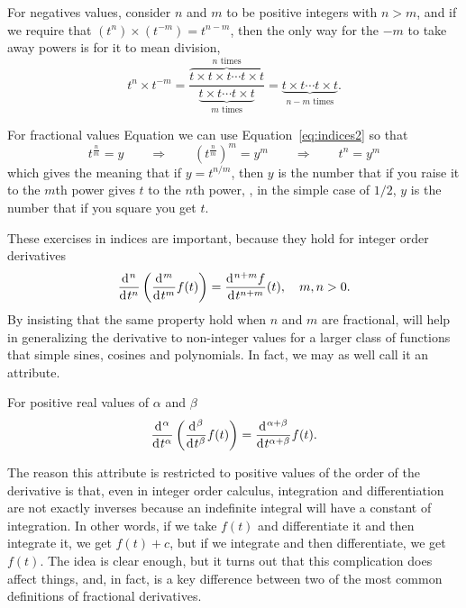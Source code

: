 For negatives values, consider $n$ and $m$ to be positive integers with $n > m$, and if we require that $\left( t^n \right) \times \left( t^{-m} \right) = t^{n-m}$, then the only way for the $-m$ to take away powers is for it to mean division, 
\begin{equation}
  t^n \times t^{-m} = \frac{\overbrace{t \times t \times t \cdots t \times t}^{\mbox{$n$ times}}}{\underbrace{t \times t \cdots t \times t}_{\mbox{$m$ times}}} = \underbrace{t \times t  \cdots t \times t}_{\mbox{$n-m$ times}}.
  \label{eq:indices3}
\end{equation}

For fractional values Equation we can use Equation~\ref{eq:indices2} so that
\begin{equation}
  t^\frac{n}{m} = y \qquad \Longrightarrow \qquad \left( t^\frac{n}{m} \right)^m = y^m \qquad \Longrightarrow \qquad t^n = y^m
\end{equation}
which gives the meaning that if $y = t^{n/m}$, then $y$ is the number that if you raise it to the $m$th power gives $t$ to the $n$th power, \eg, in the simple case of $1/2$, $y$ is the number that if you square you get $t$.

These exercises in indices are important, because they hold for integer order derivatives
\begin{equation}
  \label{eq:derivindex}
  \frac{\operatorname{d}\hspace*{-1pt}^n}{\operatorname{d}\hspace*{-1pt} t^n} \left( \frac{\operatorname{d}\hspace*{-1pt}^m}{\operatorname{d}\hspace*{-1pt} t^m} f(t) \right) = \frac{\operatorname{d}\hspace*{-1pt}^{n+m} f}{\operatorname{d}\hspace*{-1pt} t^{n+m}}(t), \quad m,n > 0.
\end{equation}
By insisting that the same property hold when $n$ and $m$ are fractional, will help in generalizing the derivative to non-integer values for a larger class of functions that simple sines, cosines and polynomials. In fact, we may as well call it an attribute. 

\begin{attribute}
  For positive real values of $\alpha$ and $\beta$
  \begin{equation}
	\frac{\operatorname{d}\hspace*{-1pt}^\alpha}{\operatorname{d}\hspace*{-1pt} t^\alpha} \left( \frac{\operatorname{d}\hspace*{-1pt}^\beta}{\operatorname{d}\hspace*{-1pt} t^\beta} f(t) \right) = \frac{\operatorname{d}\hspace*{-1pt}^{\alpha + \beta}}{\operatorname{d}\hspace*{-1pt} t^{\alpha + \beta}}f(t).
	\label{eq:derivindices}
  \end{equation}
\end{attribute}

The reason this attribute is restricted to positive values of the order of the
derivative is that, even in integer order calculus, integration and
differentiation are not exactly inverses because an indefinite integral will
have a constant of integration. In other words, if we take $f(t)$ and
differentiate it and then integrate it, we get $f(t) + c$, but if we integrate
and then differentiate, we get $f(t)$. The idea is clear enough, but it turns
out that this complication does affect things, and, in fact, is a key difference
between two of the most common definitions of fractional derivatives. 



